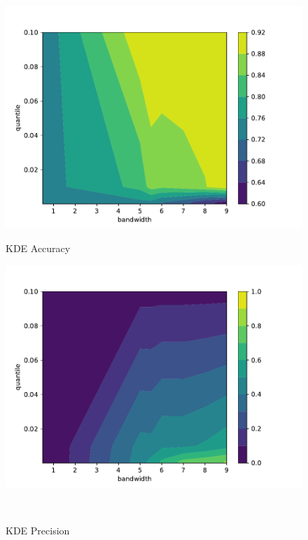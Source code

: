 \begin{figure}[!htb] %
    \begin{minipage}[t]{0.5\textwidth}
        \vspace{0pt}
        \includegraphics[width=\textwidth]{images/kde-accuracy.pdf}
        \caption{KDE Accuracy}
    \end{minipage}
    \hfill
    \begin{minipage}[t]{0.5\textwidth}
        \vspace{0pt}
        \includegraphics[width=\textwidth]{images/kde-precision.pdf}
        \caption{KDE Precision}
    \end{minipage}
    \\

\end{figure}
